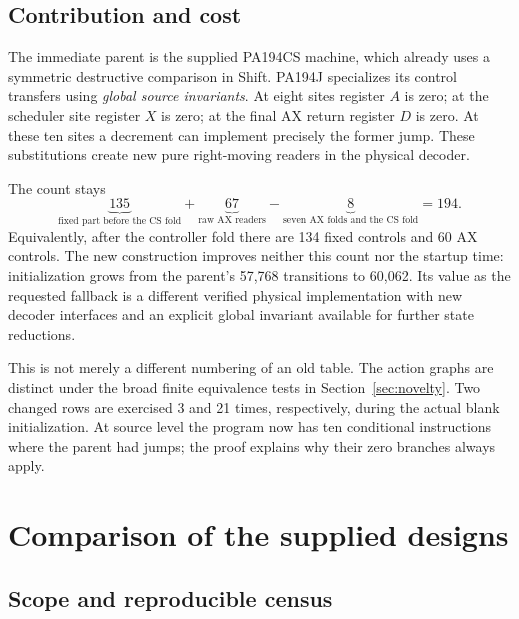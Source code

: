 \documentclass[11pt,letterpaper]{article}
\begin{document}
\subsection{Contribution and cost}

The immediate parent is the supplied PA194CS machine, which already uses
a symmetric destructive comparison in Shift. PA194J specializes its
control transfers using \emph{global source invariants}. At eight sites
register \(A\) is zero; at the scheduler site register \(X\) is zero; at
the final AX return register \(D\) is zero. At these ten sites a decrement
can implement precisely the former jump. These substitutions create new
pure right-moving readers in the physical decoder.

The count stays
\[
 \underbrace{135}_{\text{fixed part before the CS fold}}
 +\underbrace{67}_{\text{raw AX readers}}
 -\underbrace{8}_{\text{seven AX folds and the CS fold}}
 =194.
\]
Equivalently, after the controller fold there are 134 fixed controls and
60 AX controls. The new construction improves neither this count nor the
startup time: initialization grows from the parent's 57,768 transitions
to 60,062. Its value as the requested fallback is a different verified
physical implementation with new decoder interfaces and an explicit
global invariant available for further state reductions.

This is not merely a different numbering of an old table. The action
graphs are distinct under the broad finite equivalence tests in
Section~\ref{sec:novelty}. Two changed rows are exercised 3 and 21 times,
respectively, during the actual blank initialization. At source level the
program now has ten conditional instructions where the parent had jumps;
the proof explains why their zero branches always apply.

\section{Comparison of the supplied designs}
\label{sec:comparison}

\subsection{Scope and reproducible census}
\end{document}
